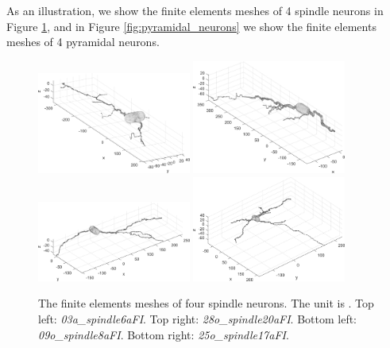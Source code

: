 \documentclass[a4paper]{article}
\begin{document}
As an illustration, we show the finite elements meshes of 4 spindle neurons in Figure \ref{fig:spindle_neurons}, and in Figure \ref{fig:pyramidal_neurons} we show the finite elements meshes of 4 pyramidal neurons.
\begin{figure}
    \centering
    \includegraphics[width=0.45\textwidth]{paper_neuron/03a_spindle6aFI.jpg}
    \includegraphics[width=0.45\textwidth]{paper_neuron/28o_spindle20aFI.jpg} \\
    \includegraphics[width=0.45\textwidth]{paper_neuron/09o_spindle8aFI.jpg}
    \includegraphics[width=0.45\textwidth]{paper_neuron/25o_spindle17aFI.jpg}
    \caption{The finite elements meshes of four spindle neurons. The unit is \lunit. Top left: {\it 03a\_spindle6aFI}. Top right: {\it 28o\_spindle20aFI}. Bottom left: {\it 09o\_spindle8aFI}. Bottom right: {\it 25o\_spindle17aFI}.}
    \label{fig:spindle_neurons}
\end{figure}
\end{document}

